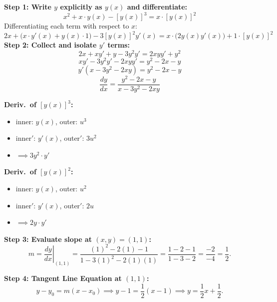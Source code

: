 \documentclass[10.5pt]{article}
\begin{document}
\begin{minipage}[t]{0.68\textwidth}
  \textbf{Step 1: Write $y$ explicitly as $y(x)$ and differentiate:}
  \[
    x^2 + x \cdot y(x) - [y(x)]^3 = x \cdot [y(x)]^2
  \]
  Differentiating each term with respect to $x$:
  \[
    2x + \big(x \cdot y'(x) + y(x) \cdot 1\big) - 3[y(x)]^2 y'(x) = x \cdot \big(2y(x) y'(x)\big) + 1 \cdot [y(x)]^2
  \]
  \textbf{Step 2: Collect and isolate $y'$ terms:}
  \[
    2x + x y' + y - 3y^2 y' = 2xy y' + y^2
  \]
  \[
    x y' - 3y^2 y' - 2xy y' = y^2 - 2x - y
  \]
  \[
    y'(x - 3y^2 - 2xy) = y^2 - 2x - y
  \]
  \[
    \frac{dy}{dx} = \frac{y^2 - 2x - y}{x - 3y^2 - 2xy}
  \]
\end{minipage}
\hfill
\begin{minipage}[t]{0.29\textwidth}
  \begin{tcolorbox}[colback=yellow!5!white, colframe=orange!80!black, boxrule=0.6pt, arc=2pt, left=4pt, right=4pt, top=4pt, bottom=4pt]
    \textbf{\footnotesize Deriv.\ of $[y(x)]^3$:}
    \begin{itemize}[leftmargin=0.9em, topsep=0pt, itemsep=0pt]
      \item \scriptsize inner: $y(x)$, outer: $u^3$
      \item \scriptsize inner$'$: $y'(x)$, outer$'$: $3u^2$
      \item \scriptsize $\implies 3y^2 \cdot y'$
    \end{itemize}
    \vspace{2pt}
    \textbf{\footnotesize Deriv.\ of $[y(x)]^2$:}
    \begin{itemize}[leftmargin=0.9em, topsep=0pt, itemsep=0pt]
      \item \scriptsize inner: $y(x)$, outer: $u^2$
      \item \scriptsize inner$'$: $y'(x)$, outer$'$: $2u$
      \item \scriptsize $\implies 2y \cdot y'$
    \end{itemize}
  \end{tcolorbox}
\end{minipage}

\vspace{0.05in}

\textbf{Step 3: Evaluate slope at $(x,y) = (1,1)$:}
\[
  m = \left.\frac{dy}{dx}\right|_{(1,1)} = \frac{(1)^2 - 2(1) - 1}{1 - 3(1)^2 - 2(1)(1)} = \frac{1 - 2 - 1}{1 - 3 - 2} = \frac{-2}{-4} = \frac{1}{2}.
\]

\textbf{Step 4: Tangent Line Equation at $(1,1)$:}
\[
  y - y_0 = m(x - x_0) \implies y - 1 = \frac{1}{2}(x - 1) \implies y = \frac{1}{2}x + \frac{1}{2}.
\]
\end{document}
